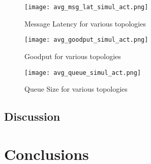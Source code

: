 \documentclass[english]{article}
\begin{document}
\begin{figure}[ht]
\centering
\texttt{[image: avg\_msg\_lat\_simul\_act.png]}
\caption{Message Latency for various topologies}
\label{overflow}
\end{figure}

\begin{figure}[ht]
\centering
\texttt{[image: avg\_goodput\_simul\_act.png]}
\caption{Goodput for various topologies}
\label{overflow}
\end{figure}

\begin{figure}[ht]
\centering
\texttt{[image: avg\_queue\_simul\_act.png]}
\caption{Queue Size for various topologies}
\label{overflow}
\end{figure}


\subsection{Discussion}





\section{Conclusions}
\end{document}
